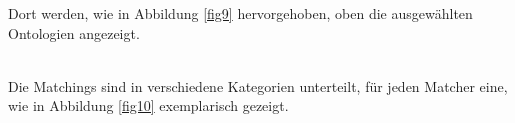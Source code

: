 		\pagebreak[4]
		
		Dort werden, wie in Abbildung \ref{fig9} hervorgehoben, oben die ausgewählten
		Ontologien angezeigt.\\
		\begin{minipage}{\linewidth}
			\label{fig9}  
		\end{minipage}
		\\
		Die Matchings sind in verschiedene Kategorien unterteilt, für
		jeden Matcher eine, wie in Abbildung \ref{fig10} exemplarisch gezeigt.\\
		\begin{minipage}{\linewidth}
			\label{fig10}  
		\end{minipage}
		
